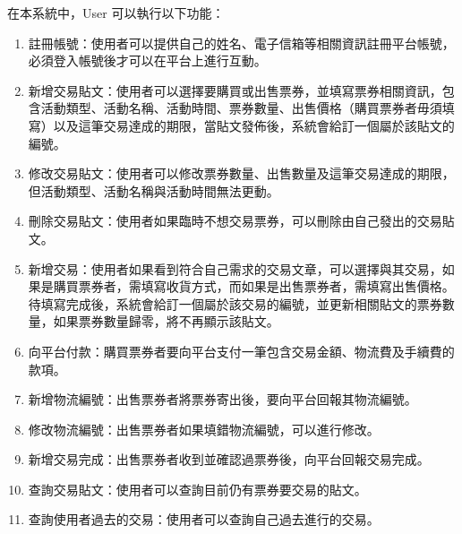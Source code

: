 \documentclass[12pt,a4paper]{article}
\begin{document}
在本系統中，User 可以執行以下功能：
\begin{enumerate}
\item 

註冊帳號：使用者可以提供自己的姓名、電子信箱等相關資訊註冊平台帳號，必須登入帳號後才可以在平台上進行互動。

\item 

新增交易貼文：使用者可以選擇要購買或出售票券，並填寫票券相關資訊，包含活動類型、活動名稱、活動時間、票券數量、出售價格（購買票券者毋須填寫）以及這筆交易達成的期限，當貼文發佈後，系統會給訂一個屬於該貼文的編號。

\item 

修改交易貼文：使用者可以修改票券數量、出售數量及這筆交易達成的期限，但活動類型、活動名稱與活動時間無法更動。

\item 

刪除交易貼文：使用者如果臨時不想交易票券，可以刪除由自己發出的交易貼文。

\item 

新增交易：使用者如果看到符合自己需求的交易文章，可以選擇與其交易，如果是購買票券者，需填寫收貨方式，而如果是出售票券者，需填寫出售價格。待填寫完成後，系統會給訂一個屬於該交易的編號，並更新相關貼文的票券數量，如果票券數量歸零，將不再顯示該貼文。

\item 

向平台付款：購買票券者要向平台支付一筆包含交易金額、物流費及手續費的款項。

\item 

新增物流編號：出售票券者將票券寄出後，要向平台回報其物流編號。

\item 

修改物流編號：出售票券者如果填錯物流編號，可以進行修改。

\item 

新增交易完成：出售票券者收到並確認過票券後，向平台回報交易完成。

\item 

查詢交易貼文：使用者可以查詢目前仍有票券要交易的貼文。

\item 

查詢使用者過去的交易：使用者可以查詢自己過去進行的交易。
        
\end{enumerate}
   
\end{document}
